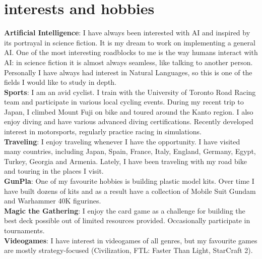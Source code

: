 \documentclass[]{cv-roald}
\begin{document}
\section*{interests and hobbies}
\textbf{Artificial Intelligence}: I have always been interested with AI and inspired by its portrayal in science fiction. It is my dream to work on implementing a general AI. One of the most interesting roadblocks to me is the way humans interact with AI: in science fiction it is almost always seamless, like talking to another person. Personally I have always had interest in Natural Languages, so this is one of the fields I would like to study in depth.\\
\textbf{Sports}: I am an avid cyclist. I train with the University of Toronto Road Racing team and participate in various local cycling events. During my recent trip to Japan, I climbed Mount Fuji on bike and toured around the Kanto region.
I also enjoy diving and have various advanced diving certifications. Recently developed interest in motorsports, regularly practice racing in simulations.\\
\textbf{Traveling}: I enjoy traveling whenever I have the opportunity. I have visited many countries, including Japan, Spain, France, Italy, England, Germany, Egypt, Turkey, Georgia and Armenia. Lately, I have been traveling with my road bike and touring in the places I visit.\\
\textbf{GunPla}: One of my favourite hobbies is building plastic model kits. Over time I have built dozens of kits and as a result have a collection of Mobile Suit Gundam and Warhammer 40K figurines.\\
\textbf{Magic the Gathering}: I enjoy the card game as a challenge for building the best deck possible out of limited resources provided. Occasionally participate in tournaments.\\
\textbf{Videogames}: I have interest in videogames of all genres, but my favourite games are mostly strategy-focused (Civilization, FTL: Faster Than Light, StarCraft 2).
\end{document}
